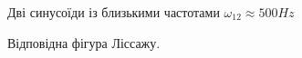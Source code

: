 \begin{figure}[h]
	\begin{minipage}[h]{0.47\linewidth}
		 Дві синусоїди із близькими частотами $\omega_{12} \approx 500 Hz$\\
	\end{minipage}
	\hfill
	\begin{minipage}[h]{0.47\linewidth}
		 Відповідна фігура Ліссажу.\\

\end{minipage}
\end{figure}
